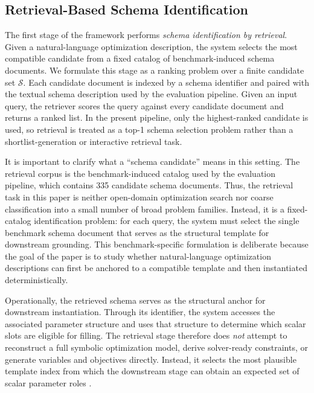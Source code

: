 \documentclass[3p]{elsarticle}
\begin{document}
\subsection{Retrieval-Based Schema Identification}
\label{subsec:method_retrieval}

The first stage of the framework performs \emph{schema identification by retrieval}. Given a natural-language optimization description, the system selects the most compatible candidate from a fixed catalog of benchmark-induced schema documents. We formulate this stage as a ranking problem over a finite candidate set $\mathcal{S}$. Each candidate document is indexed by a schema identifier and paired with the textual schema description used by the evaluation pipeline. Given an input query, the retriever scores the query against every candidate document and returns a ranked list. In the present pipeline, only the highest-ranked candidate is used, so retrieval is treated as a top-1 schema selection problem rather than a shortlist-generation or interactive retrieval task.

It is important to clarify what a ``schema candidate'' means in this setting. The retrieval corpus is the benchmark-induced catalog used by the evaluation pipeline, which contains 335 candidate schema documents. Thus, the retrieval task in this paper is neither open-domain optimization search nor coarse classification into a small number of broad problem families. Instead, it is a fixed-catalog identification problem: for each query, the system must select the single benchmark schema document that serves as the structural template for downstream grounding. This benchmark-specific formulation is deliberate because the goal of the paper is to study whether natural-language optimization descriptions can first be anchored to a compatible template and then instantiated deterministically.

Operationally, the retrieved schema serves as the structural anchor for downstream instantiation. Through its identifier, the system accesses the associated parameter structure and uses that structure to determine which scalar slots are eligible for filling. The retrieval stage therefore does \emph{not} attempt to reconstruct a full symbolic optimization model, derive solver-ready constraints, or generate variables and objectives directly. Instead, it selects the most plausible template index from which the downstream stage can obtain an expected set of scalar parameter roles \cite{nlp4lp_dataset,ramamonjison2023nl4opt,ahmaditeshnizi2024optimus_icml}.
\end{document}
